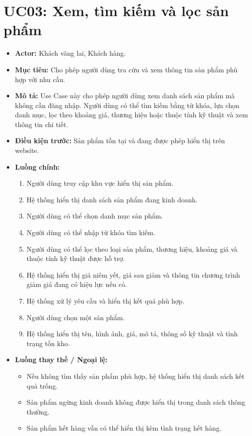 \section{UC03: Xem, tìm kiếm và lọc sản phẩm}
\begin{itemize}
    \item \textbf{Actor:} Khách vãng lai, Khách hàng.
    \item \textbf{Mục tiêu:} Cho phép người dùng tra cứu và xem thông tin sản phẩm phù hợp với nhu cầu.
    \item \textbf{Mô tả:} Use Case này cho phép người dùng xem danh sách sản phẩm mà không cần đăng nhập. Người dùng có thể tìm kiếm bằng từ khóa, lựa chọn danh mục, lọc theo khoảng giá, thương hiệu hoặc thuộc tính kỹ thuật và xem thông tin chi tiết.
    \item \textbf{Điều kiện trước:} Sản phẩm tồn tại và đang được phép hiển thị trên website.
    \item \textbf{Luồng chính:}
    \begin{enumerate}
        \item Người dùng truy cập khu vực hiển thị sản phẩm.
        \item Hệ thống hiển thị danh sách sản phẩm đang kinh doanh.
        \item Người dùng có thể chọn danh mục sản phẩm.
        \item Người dùng có thể nhập từ khóa tìm kiếm.
        \item Người dùng có thể lọc theo loại sản phẩm, thương hiệu, khoảng giá và thuộc tính kỹ thuật được hỗ trợ.
        \item Hệ thống hiển thị giá niêm yết, giá sau giảm và thông tin chương trình giảm giá đang có hiệu lực nếu có.
        \item Hệ thống xử lý yêu cầu và hiển thị kết quả phù hợp.
        \item Người dùng chọn một sản phẩm.
        \item Hệ thống hiển thị tên, hình ảnh, giá, mô tả, thông số kỹ thuật và tình trạng tồn kho.
    \end{enumerate}
    \item \textbf{Luồng thay thế / Ngoại lệ:}
    \begin{itemize}
        \item Nếu không tìm thấy sản phẩm phù hợp, hệ thống hiển thị danh sách kết quả trống.
        \item Sản phẩm ngừng kinh doanh không được hiển thị trong danh sách thông thường.
        \item Sản phẩm hết hàng vẫn có thể hiển thị kèm tình trạng hết hàng.

\end{itemize}
\end{itemize}
